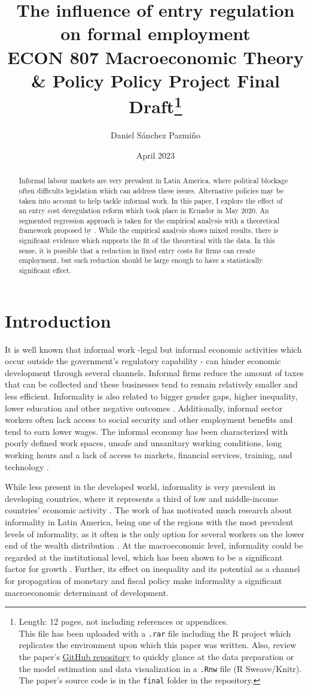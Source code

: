 \documentclass[11pt,a4paper]{article}\usepackage[]{graphicx}\usepackage[]{xcolor}
\title{The influence of entry regulation on formal employment \\[1em] 
\large{ECON 807 Macroeconomic Theory \& Policy Policy Project Final Draft}\footnote{
Length: 12 pages, not including references or appendices. \\
This file has been uploaded with a \texttt{.rar} file including the R project which replicates the environment upon which this paper was written. Also, review the paper's \href{https://github.com/dsanchezp18/econ807-policy-project}{GitHub repository} to quickly glance at the data preparation or the model estimation and data visualization in a \texttt{.Rnw} file (R Sweave/Knitr). The paper's source code is in the \texttt{final} folder in the repository.}}
\author{Daniel Sánchez Pazmiño}
\date{April 2023}
\begin{document}
\maketitle

\begin{abstract}

Informal labour markets are very prevalent in Latin America, where political blockage often difficults legislation which can address these issues. Alternative policies may be taken into account to help tackle informal work. In this paper, I explore the effect of an entry cost deregulation reform which took place in Ecuador in May 2020. An segmented regression approach is taken for the empirical analysis with a theoretical framework proposed by \textcite{Branstetter.2014}. While the empirical analysis shows mixed results, there is significant evidence which supports the fit of the theoretical with the data. In this sense, it is possible that a reduction in fixed entry costs for firms can create employment, but such reduction should be large enough to have a statistically significant effect.
\end{abstract}

\section{Introduction}

It is well known that informal work -legal but informal economic activities which occur outside the government's regulatory capability \parencite{Sassen.1994}- can hinder economic development through several channels. Informal firms reduce the amount of taxes that can be collected and these businesses tend to remain relatively smaller and less efficient. Informality is also related to bigger gender gaps, higher inequality, lower education and other negative outcomes \parencite{Delechat2020}. Additionally, informal sector workers often lack access to social security and other employment benefits and tend to earn lower wages. The informal economy has been characterized with poorly defined work spaces, unsafe and unsanitary working conditions, long working hours and a lack of access to markets, financial services, training, and technology \parencite{IloND}. 

While less present in the developed world, informality is very prevalent in developing countries, where it represents a third of low and middle-income countries' economic activity \parencite{Delechat2020}. The work of \textcite{Soto.2002} has motivated much research about informality in Latin America, being one of the regions with the most prevalent levels of informality, as it often is the only option for several workers on the lower end of the wealth distribution \parencite{Oviedo.2009}. At the macroeconomic level, informality could be regarded at the institutional level, which has been shown to be a significant factor for growth \parencite{Acemoglu.2001, RafaelLaPorta.1997, Glaeser.2004}. Further, its effect on inequality and its potential as a channel for propagation of monetary and fiscal policy \parencite{Alberola.2020} make informality a significant macroeconomic determinant of development.
\end{document}
